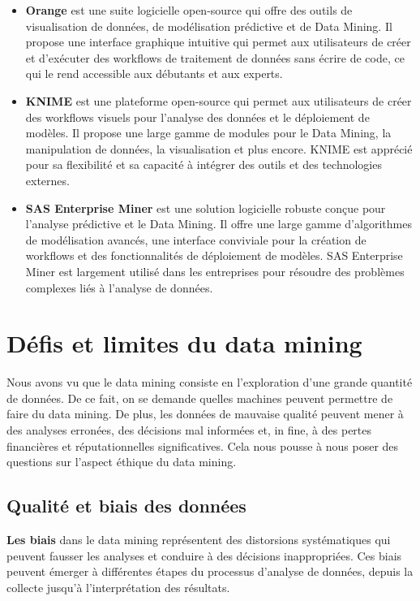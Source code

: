 \documentclass[a4paper,14pt]{article}
\begin{document}
\begin{itemize}
        
        \item \textbf{Orange} est une suite logicielle open-source qui offre des outils de visualisation de données, de modélisation prédictive et de Data Mining. Il propose une interface graphique intuitive qui permet aux utilisateurs de créer et d’exécuter des workflows de traitement de données sans écrire de code, ce qui le rend accessible aux débutants et aux experts.
    
        
        \item \textbf{KNIME} est une plateforme open-source qui permet aux utilisateurs de créer des workflows visuels pour l’analyse des données et le déploiement de modèles. Il propose une large gamme de modules pour le Data Mining, la manipulation de données, la visualisation et plus encore. KNIME est apprécié pour sa flexibilité et sa capacité à intégrer des outils et des technologies externes.
        
        \item \textbf{SAS Enterprise Miner} est une solution logicielle robuste conçue pour l’analyse prédictive et le Data Mining. Il offre une large gamme d’algorithmes de modélisation avancés, une interface conviviale pour la création de workflows et des fonctionnalités de déploiement de modèles. SAS Enterprise Miner est largement utilisé dans les entreprises pour résoudre des problèmes complexes liés à l’analyse de données.

    \end{itemize}



\section{Défis et limites du data mining}
	Nous avons vu que le data mining consiste en l’exploration d’une grande quantité de données. De ce fait, on se demande quelles machines peuvent permettre de faire du data mining. De plus, les données de mauvaise qualité peuvent mener à des analyses erronées, des décisions mal informées et, in fine, à des pertes financières et réputationnelles significatives. Cela nous pousse à nous poser des questions sur l’aspect éthique du data mining. 

	\subsection{Qualité et biais des données}
	    \textbf{Les biais} dans le data mining représentent des distorsions systématiques qui peuvent fausser les analyses et conduire à des décisions inappropriées. Ces biais peuvent émerger à différentes étapes du processus d'analyse de données, depuis la collecte jusqu'à l'interprétation des résultats.
\end{document}
